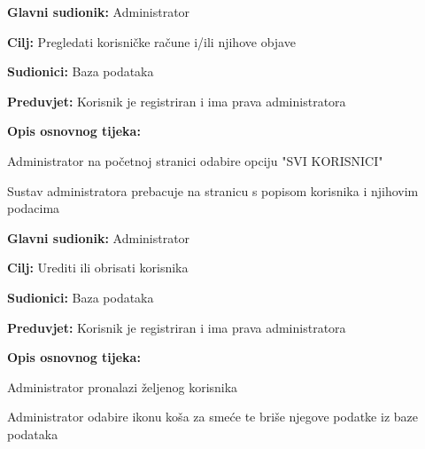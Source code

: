 \noindent {}
\begin{packed_item}
	\item \textbf{Glavni sudionik:} Administrator
	\item  \textbf{Cilj:} Pregledati korisničke račune i/ili njihove objave
	\item  \textbf{Sudionici:} Baza podataka
	\item  \textbf{Preduvjet:} Korisnik je registriran i ima prava administratora
	\item  \textbf{Opis osnovnog tijeka:}
	
	\item[] \begin{packed_enum}
		
		\item Administrator na početnoj stranici odabire opciju "SVI KORISNICI"
		\item Sustav administratora prebacuje na stranicu s popisom korisnika i njihovim podacima

	\end{packed_enum}

\end{packed_item}


\noindent {}
\begin{packed_item}
	\item \textbf{Glavni sudionik:} Administrator
	\item  \textbf{Cilj:} Urediti ili obrisati korisnika
	\item  \textbf{Sudionici:} Baza podataka
	\item  \textbf{Preduvjet:} Korisnik je registriran i ima prava administratora
	\item  \textbf{Opis osnovnog tijeka:}
	
	\item[] \begin{packed_enum}
		
		\item Administrator pronalazi željenog korisnika
		\item Administrator odabire ikonu koša za smeće te briše njegove podatke iz baze podataka
	\end{packed_enum}

\end{packed_item}


